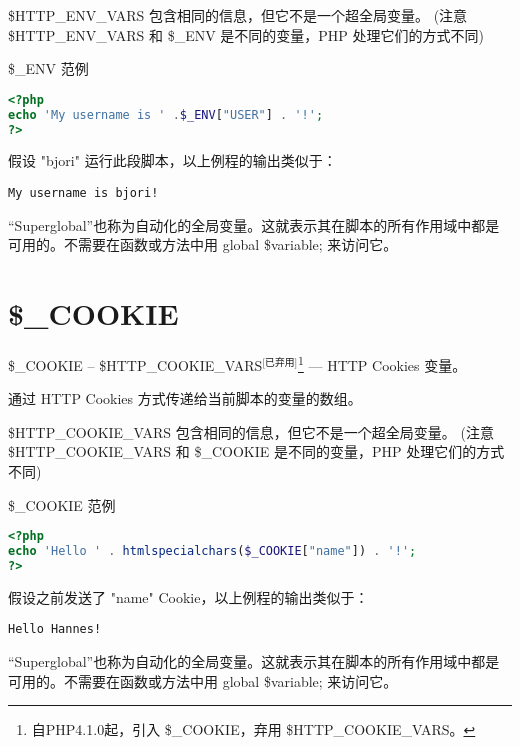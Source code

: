 \$HTTP\_ENV\_VARS 包含相同的信息，但它不是一个超全局变量。 (注意 \$HTTP\_ENV\_VARS 和 \$\_ENV 是不同的变量，PHP 处理它们的方式不同)





\begin{example}
\$\_ENV 范例
\begin{lstlisting}[language=PHP]
<?php
echo 'My username is ' .$_ENV["USER"] . '!';
?>
\end{lstlisting}
\end{example}

假设 "bjori" 运行此段脚本，以上例程的输出类似于：

\begin{verbatim}
My username is bjori!
\end{verbatim}


“Superglobal”也称为自动化的全局变量。这就表示其在脚本的所有作用域中都是可用的。不需要在函数或方法中用 global \$variable; 来访问它。



\section{\$\_COOKIE}

\$\_COOKIE -- \$HTTP\_COOKIE\_VARS$^{\text{[已弃用]}}$\footnote{自PHP4.1.0起，引入 \$\_COOKIE，弃用 \$HTTP\_COOKIE\_VARS。} — HTTP Cookies 变量。



通过 HTTP Cookies 方式传递给当前脚本的变量的数组。

\$HTTP\_COOKIE\_VARS 包含相同的信息，但它不是一个超全局变量。 (注意 \$HTTP\_COOKIE\_VARS 和 \$\_COOKIE 是不同的变量，PHP 处理它们的方式不同)




\begin{example}
\$\_COOKIE 范例
\begin{lstlisting}[language=PHP]
<?php
echo 'Hello ' . htmlspecialchars($_COOKIE["name"]) . '!';
?>
\end{lstlisting}
\end{example}

假设之前发送了 "name" Cookie，以上例程的输出类似于：

\begin{verbatim}
Hello Hannes!
\end{verbatim}

“Superglobal”也称为自动化的全局变量。这就表示其在脚本的所有作用域中都是可用的。不需要在函数或方法中用 global \$variable; 来访问它。

